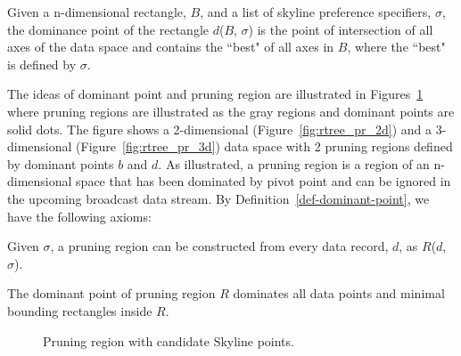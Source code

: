 \begin{definition}\label{def-dominant-point}
Given a n-dimensional rectangle, $B$, and a list of skyline preference specifiers, $\sigma$, the dominance point of the rectangle $d$($B$, $\sigma$) is the point of intersection of all axes of the data space and contains the ``best" of all axes in $B$, where the ``best" is defined by $\sigma$.
\end{definition}

The ideas of dominant point and pruning region are illustrated in Figures~\ref{fig:rtree_pr} where pruning regions are illustrated as the gray regions and dominant points are solid dots. The figure shows a 2-dimensional (Figure~\ref{fig:rtree_pr_2d}) and a 3-dimensional (Figure~\ref{fig:rtree_pr_3d}) data space with 2 pruning regions defined by dominant points $b$ and $d$. As illustrated, a pruning region is a region of an n-dimensional space that has been dominated by pivot point and can be ignored in the upcoming broadcast data stream.
By Definition~\ref{def-dominant-point}, we have the following axioms:

\begin{axiom}\label{axiom:record_pruning}
Given $\sigma$, a pruning region can be constructed from every data record, $d$, as $R$($d$, $\sigma$).
\end{axiom}

\begin{axiom}\label{axiom:pivot_point}
The dominant point of pruning region $R$ dominates all data points and minimal bounding rectangles inside $R$.
\end{axiom}

\begin{figure}[!h]
\centering
{}
\caption{Pruning region with candidate Skyline points.\label{fig:rtree_pr}}
\end{figure}

